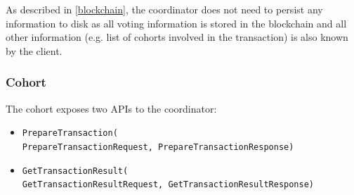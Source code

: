 \documentclass[11pt,sigplan,screen,nonacm]{acmart}
\begin{document}
As described in \ref{blockchain}, the coordinator does not need to persist any information to disk as all voting information is stored in the blockchain and all other information (e.g. list of cohorts involved in the transaction) is also known by the client.

\subsubsection{Cohort} \label{cohort}
The cohort exposes two APIs to the coordinator:
\begin{itemize}
  \item \texttt{PrepareTransaction(\\PrepareTransactionRequest, PrepareTransactionResponse)}
  \item \texttt{GetTransactionResult(\\GetTransactionResultRequest, GetTransactionResultResponse)}
\end{itemize} 
\end{document}
